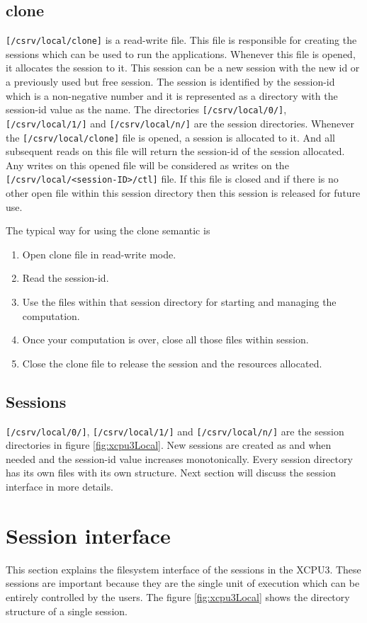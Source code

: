 \subsection{clone} 
\texttt{[/csrv/local/clone]} is a read-write file.  This file is responsible
for creating the sessions which can be used to run the applications.  Whenever this file
is opened, it allocates the session to it.  This session can be a new session with the new
id or a previously used but free session.  The session is identified by the session-id which
is a non-negative number and it is represented as a directory with the session-id value as the name.
The directories \texttt{[/csrv/local/0/]},
\texttt{[/csrv/local/1/]} and \texttt{[/csrv/local/n/]} are the session directories.
Whenever the \texttt{[/csrv/local/clone]} file is opened, a session is allocated to it.
And all subsequent reads on this file will return the session-id of the session
allocated.  Any writes on this opened file will be considered as writes on 
the \texttt{[/csrv/local/<session-ID>/ctl]} file.  If this file is closed and if there
is no other open file within this session directory then this session is released
for future use.

The typical way for using the clone semantic is 
\begin{enumerate}
\item Open clone file in read-write mode.
\item Read the session-id. 
\item Use the files within that session directory for starting and managing the computation.
\item Once your computation is over, close all those files within session.
\item Close the clone file to release the session and the resources allocated. 
\end{enumerate}

\subsection{Sessions} \texttt{[/csrv/local/0/]},
\texttt{[/csrv/local/1/]} and \texttt{[/csrv/local/n/]} are the session directories in
figure \ref{fig:xcpu3Local}. New sessions are created as and when needed and the session-id
value increases monotonically.  Every session directory has its own files with its own
structure.  Next section will discuss the session interface in more details.

\section{Session interface}
This section explains the filesystem interface of the sessions in the XCPU3.
These sessions are important because they are the single unit of execution which can
be entirely controlled by the users.  The figure \ref{fig:xcpu3Local} shows the directory 
structure of a single session.

